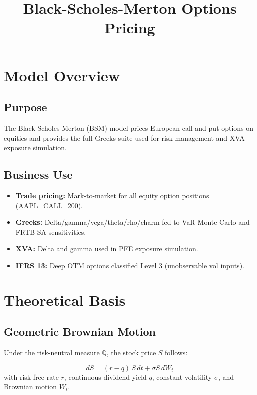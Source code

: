 \documentclass{apex_mdd}
\title{Black-Scholes-Merton Options Pricing}
\begin{document}
\maketitle
\statusbadge

\tableofcontents
\newpage

\section{Model Overview}

\subsection{Purpose}
The Black-Scholes-Merton (BSM) model prices European call and put options on equities and provides the full Greeks suite used for risk management and XVA exposure simulation.

\subsection{Business Use}
\begin{itemize}
  \item \textbf{Trade pricing:} Mark-to-market for all equity option positions (AAPL\_CALL\_200).
  \item \textbf{Greeks:} Delta/gamma/vega/theta/rho/charm fed to VaR Monte Carlo and FRTB-SA sensitivities.
  \item \textbf{XVA:} Delta and gamma used in PFE exposure simulation.
  \item \textbf{IFRS 13:} Deep OTM options classified Level 3 (unobservable vol inputs).
\end{itemize}

\section{Theoretical Basis}

\subsection{Geometric Brownian Motion}
Under the risk-neutral measure $\mathbb{Q}$, the stock price $S$ follows:
\begin{formulabox}
\[
  dS = (r - q)\,S\,dt + \sigma S\,dW_t
\]
with risk-free rate $r$, continuous dividend yield $q$, constant volatility $\sigma$, and Brownian motion $W_t$.
\end{formulabox}
\end{document}

